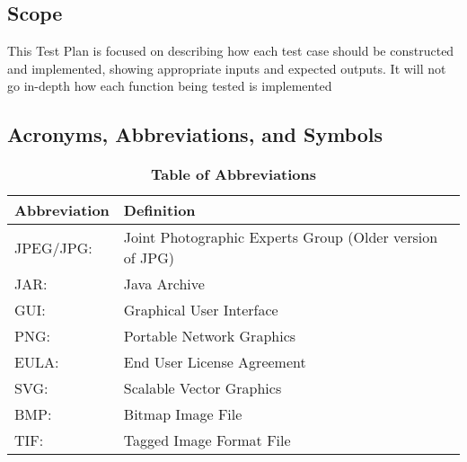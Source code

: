 \documentclass[12pt, titlepage]{article}
\begin{document}
\subsection{Scope}

This Test Plan is focused on describing how each test case should be constructed and implemented, showing appropriate inputs and expected outputs. It will not go in-depth how each function being tested is implemented

\subsection{Acronyms, Abbreviations, and Symbols}
	
\begin{table}[hbp]
\caption{\textbf{Table of Abbreviations}} \label{Table}

\begin{tabularx}{\textwidth}{p{3cm}X}
\toprule
\textbf{Abbreviation} & \textbf{Definition} \\
\midrule
JPEG/JPG: & Joint Photographic Experts Group (Older version of JPG)\\
JAR: & Java Archive \\
GUI: & Graphical User Interface\\
PNG:  & Portable Network Graphics\\
EULA: & End User License Agreement\\
SVG: & Scalable Vector Graphics\\
BMP: & Bitmap Image File\\
TIF: & Tagged Image Format File \\
\bottomrule
\end{tabularx}

\end{table}
\end{document}
